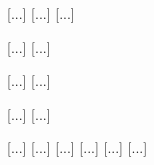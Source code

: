 \documentclass[12pt, a4paper]{article}
\begin{document}
\begin{center}
{                                                                                                                                                                                                    [...]
                                                                                                                                                                                                    [...]
                                                                                                                                                                                                    [...]

                                                                                                                                                                                                    [...]
                                                                                                                                                                                                    [...]

                                                                                                                                                                                                    [...]
                                                                                                                                                                                                    [...]

                                                                                                                                                                                                    [...]
                                                                                                                                                                                                    [...]

                                                                                                                                                                                                    [...]
                                                                                                                                                                                                    [...]
                                                                                                                                                                                                    [...]
                                                                                                                                                                                                    [...]
                                                                                                                                                                                                    [...]
                                                                                                                                                                                                    [...]

}
\end{center}
\end{document}
